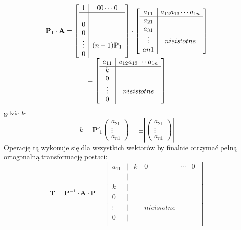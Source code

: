 \documentclass{article}
\begin{document}
\begin{equation}
	\begin{array}{c}
	\textbf{P}_1 \cdot \textbf{A} = 
	\begin{bmatrix}
	\begin{array}{c|c}
		1 &  0  0  \cdots 0 \\
		\hline \\
		0 \\
		0 \\
		\vdots &              (n-1)\textbf{P}_1\\
		0
	\end{array}	
	\end{bmatrix}
	\cdot
	\begin{bmatrix}
	\begin{array}{c|c}
		a_{11} &  a_{12}  a_{13}  \cdots a_{1n} \\
		\hline 
		a_{21} \\
		a_{31} \\
		\vdots &              nieistotne\\
		a{n1}
	\end{array}	
	\end{bmatrix} \\
	= 
	\begin{bmatrix}
	\begin{array}{c|c}
		a_{11} &  a_{12}  a_{13}  \cdots a_{1n} \\
		\hline 
		k \\
		0 \\
		\vdots &              nieistotne\\
		0
	\end{array}	
	\end{bmatrix}
	\end{array}
\end{equation}
gdzie $k$:
\begin{equation}
k = \textbf{P}' _1 
	\begin{pmatrix}
	a_{21} \\
	\vdots \\
	a_{n1}
	\end{pmatrix}
	= \pm |
	\begin{pmatrix}
	a_{21} \\
	\vdots \\
	a_{n1}
	\end{pmatrix}
	|
\end{equation}
Operację tą wykonuje się dla wszystkich wektorów by finalnie otrzymać pełną ortogonalną transformację postaci:
\begin{equation}
\textbf{T} = \textbf{P}^{-1} \cdot \textbf{A} \cdot \textbf{P} = 
	\begin{bmatrix}
	a_{11} & | & k & 0 & \cdots & 0 \\
	- & | & - & - & - & - \\
	k & | \\
	0 & | \\
	\vdots & | & & nieistotne &   \\
	0 & |\\
	\end{bmatrix}	
\end{equation}
\end{document}
